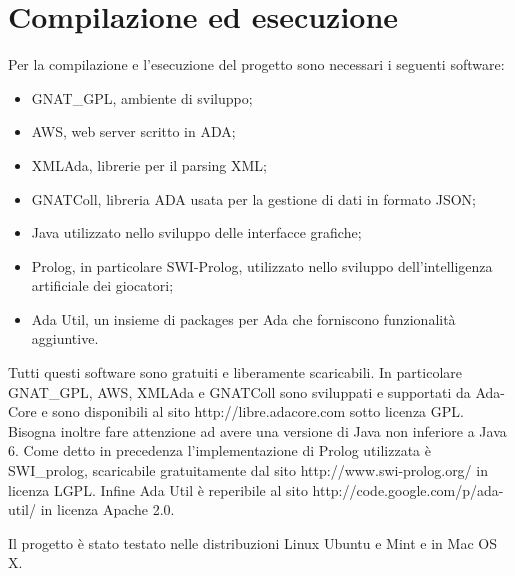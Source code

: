 
\section*{Compilazione ed esecuzione}
%
\label{sec:compilazione_esecuzione}
Per la compilazione e l'esecuzione del progetto sono necessari i seguenti software:
\begin{itemize}
\item GNAT\_GPL, ambiente di sviluppo;
\item AWS, web server scritto in ADA;
\item XMLAda, librerie per il parsing XML;
\item GNATColl, libreria ADA usata per la gestione di dati in formato JSON; 
\item Java utilizzato nello sviluppo delle interfacce grafiche;
\item Prolog, in particolare SWI-Prolog, utilizzato nello sviluppo dell'intelligenza artificiale dei giocatori;
\item Ada Util, un insieme di packages per Ada che forniscono funzionalit\`{a} aggiuntive.
\end{itemize}
\noindent Tutti questi software sono gratuiti e liberamente scaricabili. In particolare GNAT\_GPL, AWS, XMLAda e GNATColl sono sviluppati e supportati da Ada-Core e sono disponibili al sito http://libre.adacore.com sotto licenza GPL. Bisogna inoltre fare attenzione ad avere una versione di Java non inferiore a Java 6. Come detto in precedenza l'implementazione di Prolog utilizzata \`{e} SWI\_prolog, scaricabile gratuitamente dal sito http://www.swi-prolog.org/ in licenza LGPL. Infine Ada Util \`{e} reperibile al sito http://code.google.com/p/ada-util/ in licenza Apache 2.0. 

Il progetto \`{e} stato testato nelle distribuzioni Linux Ubuntu e Mint e in Mac OS X.

